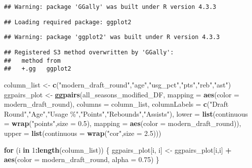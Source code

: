 \documentclass[
]{article}
\newenvironment{Shaded}{\begin{snugshade}}{\end{snugshade}}
\newcommand{\AttributeTok}[1]{\textcolor[rgb]{0.13,0.29,0.53}{#1}}
\newcommand{\ControlFlowTok}[1]{\textcolor[rgb]{0.13,0.29,0.53}{\textbf{#1}}}
\newcommand{\DecValTok}[1]{\textcolor[rgb]{0.00,0.00,0.81}{#1}}
\newcommand{\FloatTok}[1]{\textcolor[rgb]{0.00,0.00,0.81}{#1}}
\newcommand{\FunctionTok}[1]{\textcolor[rgb]{0.13,0.29,0.53}{\textbf{#1}}}
\newcommand{\NormalTok}[1]{#1}
\newcommand{\OtherTok}[1]{\textcolor[rgb]{0.56,0.35,0.01}{#1}}
\newcommand{\SpecialCharTok}[1]{\textcolor[rgb]{0.81,0.36,0.00}{\textbf{#1}}}
\newcommand{\StringTok}[1]{\textcolor[rgb]{0.31,0.60,0.02}{#1}}
\begin{document}
\begin{verbatim}
## Warning: package 'GGally' was built under R version 4.3.3
\end{verbatim}

\begin{verbatim}
## Loading required package: ggplot2
\end{verbatim}

\begin{verbatim}
## Warning: package 'ggplot2' was built under R version 4.3.3
\end{verbatim}

\begin{verbatim}
## Registered S3 method overwritten by 'GGally':
##   method from   
##   +.gg   ggplot2
\end{verbatim}

\begin{Shaded}
\begin{Highlighting}[]
\NormalTok{column\_list }\OtherTok{\textless{}{-}} \FunctionTok{c}\NormalTok{(}\StringTok{"modern\_draft\_round"}\NormalTok{,}\StringTok{"age"}\NormalTok{,}\StringTok{"usg\_pct"}\NormalTok{,}\StringTok{"pts"}\NormalTok{,}\StringTok{"reb"}\NormalTok{,}\StringTok{"ast"}\NormalTok{)}
\NormalTok{ggpairs\_plot }\OtherTok{\textless{}{-}} \FunctionTok{ggpairs}\NormalTok{(all\_seasons\_modified\_DF, }
  \AttributeTok{mapping =} \FunctionTok{aes}\NormalTok{(}\AttributeTok{color =}\NormalTok{ modern\_draft\_round),}
  \AttributeTok{columns =}\NormalTok{ column\_list,}
  \AttributeTok{columnLabels =} \FunctionTok{c}\NormalTok{(}\StringTok{"Draft Round"}\NormalTok{,}\StringTok{"Age"}\NormalTok{,}\StringTok{"Usage \%"}\NormalTok{,}\StringTok{"Points"}\NormalTok{,}\StringTok{"Rebounds"}\NormalTok{,}\StringTok{"Assists"}\NormalTok{),}
  \AttributeTok{lower =} \FunctionTok{list}\NormalTok{(}\AttributeTok{continuous =} \FunctionTok{wrap}\NormalTok{(}\StringTok{"points"}\NormalTok{,}\AttributeTok{size =} \FloatTok{0.5}\NormalTok{),}
               \AttributeTok{mapping =} \FunctionTok{aes}\NormalTok{(}\AttributeTok{color =}\NormalTok{ modern\_draft\_round)),}
  \AttributeTok{upper =} \FunctionTok{list}\NormalTok{(}\AttributeTok{continuous =} \FunctionTok{wrap}\NormalTok{(}\StringTok{"cor"}\NormalTok{,}\AttributeTok{size =} \FloatTok{2.5}\NormalTok{)))}

\ControlFlowTok{for}\NormalTok{ (i }\ControlFlowTok{in} \DecValTok{1}\SpecialCharTok{:}\FunctionTok{length}\NormalTok{(column\_list)) \{}
\NormalTok{  ggpairs\_plot[i, i] }\OtherTok{\textless{}{-}}\NormalTok{ ggpairs\_plot[i,i] }\SpecialCharTok{+} 
  \FunctionTok{aes}\NormalTok{(}\AttributeTok{color =}\NormalTok{ modern\_draft\_round, }\AttributeTok{alpha =} \FloatTok{0.75}\NormalTok{)}
\NormalTok{\}}


\end{Highlighting}
\end{Shaded}
\end{document}
